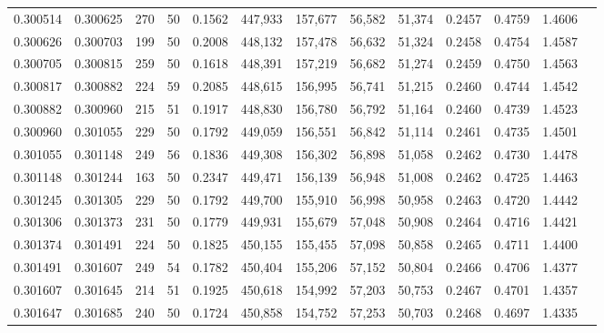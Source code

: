 \begin{tabular}{rrrrrrrrrrrrr}
0.300514 & 0.300625 &   270 &  50 &                                     0.1562 & 447,933 & 157,677 &  56,582 &  51,374 & 0.2457 & 0.4759 & 1.4606 \\
0.300626 & 0.300703 &   199 &  50 &                                     0.2008 & 448,132 & 157,478 &  56,632 &  51,324 & 0.2458 & 0.4754 & 1.4587 \\
0.300705 & 0.300815 &   259 &  50 &                                     0.1618 & 448,391 & 157,219 &  56,682 &  51,274 & 0.2459 & 0.4750 & 1.4563 \\
0.300817 & 0.300882 &   224 &  59 &                                     0.2085 & 448,615 & 156,995 &  56,741 &  51,215 & 0.2460 & 0.4744 & 1.4542 \\
0.300882 & 0.300960 &   215 &  51 &                                     0.1917 & 448,830 & 156,780 &  56,792 &  51,164 & 0.2460 & 0.4739 & 1.4523 \\
0.300960 & 0.301055 &   229 &  50 &                                     0.1792 & 449,059 & 156,551 &  56,842 &  51,114 & 0.2461 & 0.4735 & 1.4501 \\
0.301055 & 0.301148 &   249 &  56 &                                     0.1836 & 449,308 & 156,302 &  56,898 &  51,058 & 0.2462 & 0.4730 & 1.4478 \\
0.301148 & 0.301244 &   163 &  50 &                                     0.2347 & 449,471 & 156,139 &  56,948 &  51,008 & 0.2462 & 0.4725 & 1.4463 \\
0.301245 & 0.301305 &   229 &  50 &                                     0.1792 & 449,700 & 155,910 &  56,998 &  50,958 & 0.2463 & 0.4720 & 1.4442 \\
0.301306 & 0.301373 &   231 &  50 &                                     0.1779 & 449,931 & 155,679 &  57,048 &  50,908 & 0.2464 & 0.4716 & 1.4421 \\
0.301374 & 0.301491 &   224 &  50 &                                     0.1825 & 450,155 & 155,455 &  57,098 &  50,858 & 0.2465 & 0.4711 & 1.4400 \\
0.301491 & 0.301607 &   249 &  54 &                                     0.1782 & 450,404 & 155,206 &  57,152 &  50,804 & 0.2466 & 0.4706 & 1.4377 \\
0.301607 & 0.301645 &   214 &  51 &                                     0.1925 & 450,618 & 154,992 &  57,203 &  50,753 & 0.2467 & 0.4701 & 1.4357 \\
0.301647 & 0.301685 &   240 &  50 &                                     0.1724 & 450,858 & 154,752 &  57,253 &  50,703 & 0.2468 & 0.4697 & 1.4335 \\

\end{tabular}
